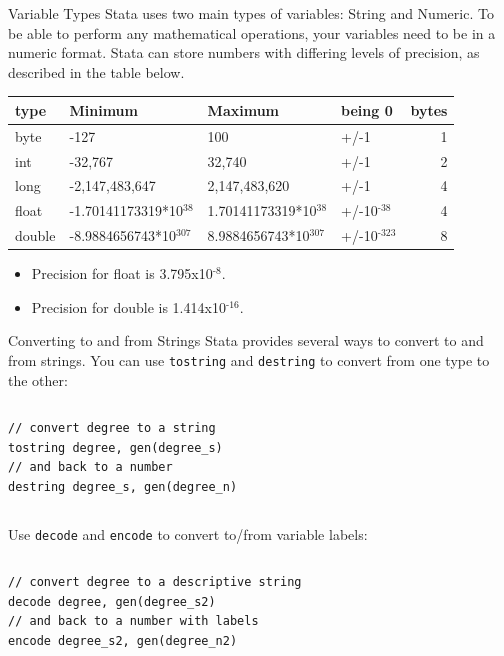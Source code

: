 \documentclass[table,smaller]{beamer}
\begin{document}
\begin{frame}[label=sec-5-1]{Variable Types}
Stata uses two main types of variables: String and Numeric. To be able to perform any mathematical operations, your variables need to be in a numeric format. Stata can store numbers with differing levels of precision, as described in the table below.

\begin{center}
\begin{tabular}{llllr}
type & Minimum & Maximum & being 0 & bytes\\
\hline
byte & -127 & 100 & +/-1 & 1\\
int & -32,767 & 32,740 & +/-1 & 2\\
long & -2,147,483,647 & 2,147,483,620 & +/-1 & 4\\
float & -1.70141173319*10$^{\text{38}}$ & 1.70141173319*10$^{\text{38}}$ & +/-10$^{\text{-38}}$ & 4\\
double & -8.9884656743*10$^{\text{307}}$ & 8.9884656743*10$^{\text{307}}$ & +/-10$^{\text{-323}}$ & 8\\
\end{tabular}
\end{center}
\begin{itemize}
\item Precision for float is 3.795x10$^{\text{-8}}$.
\item Precision for double is 1.414x10$^{\text{-16}}$.
\end{itemize}
\end{frame}
\begin{frame}[fragile,label=sec-5-2]{Converting to and from Strings}
 Stata provides several ways to convert to and from strings. You can use \verb~tostring~ and \verb~destring~ to convert from one type to the other:

\vspace{-.5em} \begin{columns}  \begin{block}{}
\begin{verbatim}
// convert degree to a string
tostring degree, gen(degree_s)
// and back to a number
destring degree_s, gen(degree_n)
\end{verbatim}
\end{block} \end{columns}

Use \verb~decode~ and \verb~encode~ to convert to/from variable labels:

\vspace{-.5em} \begin{columns}  \begin{block}{}
\begin{verbatim}
// convert degree to a descriptive string
decode degree, gen(degree_s2)
// and back to a number with labels
encode degree_s2, gen(degree_n2)
\end{verbatim}
\end{block} \end{columns}
\end{frame}
\end{document}
